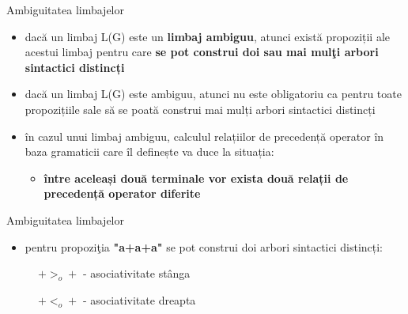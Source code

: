 \documentclass[pdf]{beamer}
\begin{document}
\begin{frame}{Ambiguitatea limbajelor}
\begin{itemize}
\item
dacă un limbaj L(G) este un \textbf{limbaj ambiguu}, atunci există propoziții ale acestui limbaj pentru care \textbf{se pot construi doi sau mai mulţi arbori sintactici distincți}
\item
dacă un limbaj L(G) este ambiguu, atunci nu este obligatoriu ca pentru toate propozițiile sale să se poată construi mai mulți arbori sintactici distincți
\item
în cazul unui limbaj ambiguu, calculul relațiilor de precedență operator în baza gramaticii care îl definește va duce la situația:
\begin{itemize}
\item
\textbf{între aceleași două terminale vor exista două relații de precedență operator diferite}
\end{itemize}
\end{itemize}
\end{frame}



\begin{frame}{Ambiguitatea limbajelor}

\begin{itemize}
\item
pentru propoziţia \textbf{"a+a+a"} se pot construi doi arbori sintactici distincți:
\end{itemize}

\begin{figure}[H]
\begin{minipage}[c][1\width]{0.3\textwidth}
\centering
\caption{$+ >_o +$ - asociativitate stânga}
\end{minipage}
\begin{minipage}[c]{0.4\textwidth} 
\centering
\caption{$+ <_o +$ - asociativitate dreapta}
\end{minipage}
\end{figure}

\end{frame}
\end{document}
